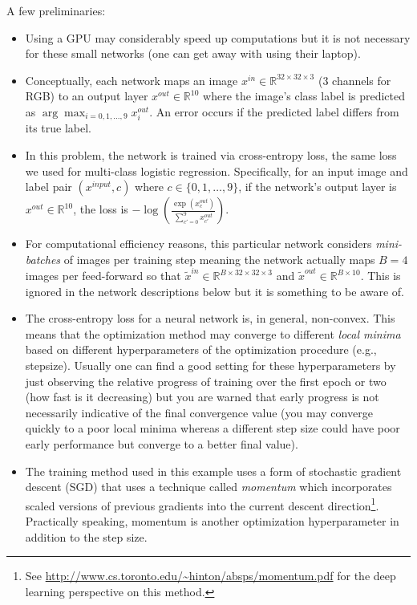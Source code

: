 \documentclass{article}
\newcommand{\field}[1]{\mathbb{#1}}
\newcommand{\1}{\mathbf{1}}
\newcommand{\R}{\field{R}} %
\begin{document}
A few preliminaries:
\begin{itemize}
  \item Using a GPU may considerably speed up computations but it is not necessary for these small networks (one can get away with using their laptop).
  \item Conceptually, each network maps an image $x^{in} \in \R^{32 \times 32 \times 3}$ (3 channels for RGB) to an output layer $x^{out} \in \R^{10}$ where the image's class label is predicted as $\arg\max_{i=0,1,\dots,9} x_{i}^{out}$. An error occurs if the predicted label differs from its true label. 
  \item In this problem, the network is trained via cross-entropy loss, the same loss we used for multi-class logistic regression. Specifically, for an input image and label pair $(x^{input}, c)$ where $c \in \{0,1,\dots,9\}$, if the network's output layer is $x^{out} \in \R^{10}$, the loss is $-\log( \frac{\exp(x_c^{out})}{\sum_{c'=0}^9 x_{c'}^{out}})$.
  \item For computational efficiency reasons, this particular network considers \emph{mini-batches} of images per training step meaning the network actually maps $B=4$ images per feed-forward so that $\widetilde{x}^{in} \in \R^{B \times 32 \times 32 \times 3}$  and $\widetilde{x}^{out} \in \R^{B \times 10}$.
  This is ignored in the network descriptions below but it is something to be aware of. 
  \item The cross-entropy loss for a neural network is, in general, non-convex. 
  This means that the optimization method may converge to different \emph{local minima} based on different hyperparameters of the optimization procedure (e.g., stepsize). 
  Usually one can find a good setting for these hyperparameters by just observing the relative progress of training over the first epoch or two (how fast is it decreasing) but you are warned that early progress is not necessarily indicative of the final convergence value (you may converge quickly to a poor local minima whereas a different step size could have poor early performance but converge to a better final value). 
  \item The training method used in this example uses a form of stochastic gradient descent (SGD) that uses a technique called \emph{momentum} which incorporates scaled versions of previous gradients into the current descent direction\footnote{See \url{http://www.cs.toronto.edu/~hinton/absps/momentum.pdf} for the deep learning perspective on this method.}. Practically speaking, momentum is another optimization hyperparameter in addition to the step size. 

\end{itemize}
\end{document}
